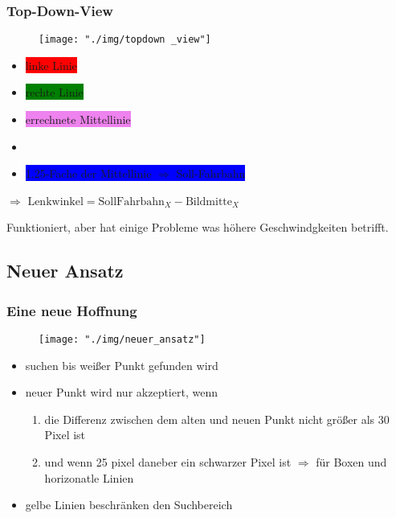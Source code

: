 \documentclass{beamer}
\begin{document}
	\begin{frame}
		\frametitle{Top-Down-View}
		\begin{center}
			\begin{figure}[h]
				\texttt{[image: "./img/topdown \_view"]}
				\label{fig:topdown}
			\end{figure}
		\end{center}

		\begin{itemize}
			\item \colorbox{red}{linke Linie}
			\item \colorbox{green}{rechte Linie}
			\item \colorbox{violet}{errechnete Mittellinie}
			\item \colorbox{white}{\color{black}{Bildmitte $	\Leftrightarrow$ Automitte}}
			\item \colorbox{blue}{1.25-Fache der Mittellinie $\Rightarrow$ Soll-Fahrbahn}
		\end{itemize}
	$\Rightarrow$ $\text{Lenkwinkel} = \text{SollFahrbahn}_X - \text{Bildmitte}_X$
	\end{frame}
	
	\begin{frame}
		\center
		Funktioniert, aber hat einige Probleme was höhere Geschwindgkeiten betrifft.
	\end{frame}
	
	\subsection{Neuer Ansatz}
	
	\begin{frame}
		\frametitle{Eine neue Hoffnung}
		\begin{center}
			\begin{figure}[h]
				\texttt{[image: "./img/neuer\_ansatz"]}
				\label{fig:neuer_ansatz}
			\end{figure}
		\end{center}
		
		\begin{itemize}
			\item suchen bis weißer Punkt gefunden wird
			\item neuer Punkt wird nur akzeptiert, wenn
			\begin{enumerate}
			\item die Differenz zwischen dem alten und neuen Punkt nicht größer als 30 Pixel ist
			\item und wenn 25 pixel daneber ein schwarzer Pixel ist $\Rightarrow$ für Boxen und horizonatle Linien
			\end{enumerate}
			\item gelbe Linien beschränken den Suchbereich
		\end{itemize}
		
		
	\end{frame}
\end{document}
